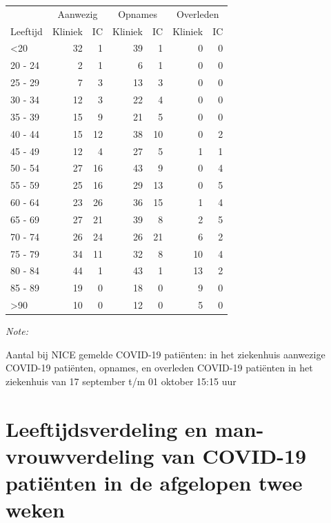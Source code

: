 \documentclass[
  english,
  man,floatsintext]{apa6}
\begin{document}
\begin{table}
\centering\begingroup\fontsize{10}{12}\selectfont

\begin{threeparttable}
\begin{tabular}{lrrrrrr}
\toprule
\multicolumn{1}{c}{ } & \multicolumn{2}{c}{Aanwezig} & \multicolumn{2}{c}{Opnames} & \multicolumn{2}{c}{Overleden} \\
\cmidrule(l{3pt}r{3pt}){2-3} \cmidrule(l{3pt}r{3pt}){4-5} \cmidrule(l{3pt}r{3pt}){6-7}
Leeftijd & Kliniek & IC & Kliniek & IC & Kliniek & IC\\
\midrule
<20 & 32 & 1 & 39 & 1 & 0 & 0\\
20 - 24 & 2 & 1 & 6 & 1 & 0 & 0\\
25 - 29 & 7 & 3 & 13 & 3 & 0 & 0\\
30 - 34 & 12 & 3 & 22 & 4 & 0 & 0\\
35 - 39 & 15 & 9 & 21 & 5 & 0 & 0\\
40 - 44 & 15 & 12 & 38 & 10 & 0 & 2\\
45 - 49 & 12 & 4 & 27 & 5 & 1 & 1\\
50 - 54 & 27 & 16 & 43 & 9 & 0 & 4\\
55 - 59 & 25 & 16 & 29 & 13 & 0 & 5\\
60 - 64 & 23 & 26 & 36 & 15 & 1 & 4\\
65 - 69 & 27 & 21 & 39 & 8 & 2 & 5\\
70 - 74 & 26 & 24 & 26 & 21 & 6 & 2\\
75 - 79 & 34 & 11 & 32 & 8 & 10 & 4\\
80 - 84 & 44 & 1 & 43 & 1 & 13 & 2\\
85 - 89 & 19 & 0 & 18 & 0 & 9 & 0\\
>90 & 10 & 0 & 12 & 0 & 5 & 0\\
\bottomrule
\end{tabular}
\begin{tablenotes}
\item \textit{Note: } 
\item Aantal bij NICE gemelde COVID-19 patiënten: in het ziekenhuis aanwezige COVID-19 patiënten, opnames, en overleden COVID-19 patiënten in het ziekenhuis van 17 september t/m 01 oktober 15:15 uur
\end{tablenotes}
\end{threeparttable}
\endgroup{}
\end{table}

\newpage

\hypertarget{leeftijdsverdeling-en-man-vrouwverdeling-van-covid-19-patiuxebnten-in-de-afgelopen-twee-weken}{%
\section{Leeftijdsverdeling en man-vrouwverdeling van COVID-19 patiënten in de afgelopen twee weken}\label{leeftijdsverdeling-en-man-vrouwverdeling-van-covid-19-patiuxebnten-in-de-afgelopen-twee-weken}}
\end{document}
